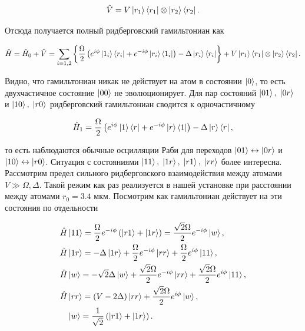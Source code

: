 \begin{equation}
	\hat{V} = V \left| r_1 \right\rangle\left\langle r_1 \right|\otimes \left| r_2 \right\rangle\left\langle r_2 \right|.
\end{equation}

Отсюда получается полный ридберговский гамильтониан как 

\begin{equation}
	\hat{H} = \hat{H}_0 + \hat{V} = \sum_{i=1,2}\left\{ \frac{\Omega}{2}\left(e^{i\phi}\left| 1_i \right\rangle\left\langle r_i \right| + e^{-i\phi}\left| r_i \right\rangle\left\langle 1_i \right|\right)-\Delta \left| r_i \right\rangle\left\langle r_i \right|\right\} + V \left| r_1 \right\rangle\left\langle r_1 \right|\otimes \left| r_2 \right\rangle\left\langle r_2 \right|.
\end{equation}

Видно, что гамильтониан никак не действует на атом в состоянии $\left| 0 \right\rangle$, то есть двухчастичное состояние $\left| 00 \right\rangle$ не эволюционирует. Для пар состояний $\left| 01 \right\rangle, \; \left| 0r \right\rangle$ и $\left| 10 \right\rangle, \; \left| r0 \right\rangle$ ридберговский гамильтониан сводится к одночастичному 

\begin{equation}
	\hat{H}_{1} = \frac{\Omega}{2}\left(e^{i\phi}\left| 1 \right\rangle\left\langle r \right| + e^{-i\phi}\left| r \right\rangle\left\langle 1 \right|\right)-\Delta \left| r \right\rangle\left\langle r \right|, 
\end{equation}

то есть наблюдаются обычные осцилляции Раби для переходов $\left| 01 \right\rangle \leftrightarrow \left| 0r \right\rangle$ и $\left| 10 \right\rangle\leftrightarrow \left| r0 \right\rangle$. Ситуация с состояниями $\left| 11 \right\rangle, \; \left| 1r \right\rangle, \; \left| r1 \right\rangle, \;\left| rr \right\rangle$ более интересна. Рассмотрим предел сильного ридберговского взаимодействия между атомами $V \gg \Omega, \Delta$. Такой режим как раз реализуется в нашей установке при расстоянии между атомами $r_0 = 3.4 \text{ мкм}$. Посмотрим как гамильтониан действует на эти состояния по отдельности 


\begin{equation}
	\begin{aligned}
		\hat{H} & \left| 11 \right\rangle = \frac{\Omega}{2}e^{-i\phi}\left(\left| r1 \right\rangle + \left| 1r \right\rangle\right) = \frac{\sqrt{2}\Omega}{2}e^{-i\phi}\left| w \right\rangle,\\
		\hat{H} & \left| 1r \right\rangle = -\Delta \left| 1r \right\rangle + \frac{\Omega}{2}e^{-i\phi}\left| rr \right\rangle + \frac{\Omega}{2}e^{i\phi}\left| 11 \right\rangle, \\
		\hat{H} & \left| w \right\rangle = -\sqrt{2}\Delta \left| w \right\rangle + \frac{\sqrt{2}\Omega}{2}e^{-i\phi}\left| rr \right\rangle + \frac{\sqrt{2}\Omega}{2}e^{i\phi}\left| 11 \right\rangle   ,\\
		\hat{H} & \left| rr \right\rangle = (V-2\Delta)\left| rr \right\rangle + \frac{\sqrt{2}\Omega}{2}e^{i\phi}\left| w \right\rangle, \\
		& \left| w \right\rangle = \frac{1}{\sqrt{2}}\left(\left| r1 \right\rangle + \left| 1r \right\rangle\right).
	\end{aligned}
\end{equation}

